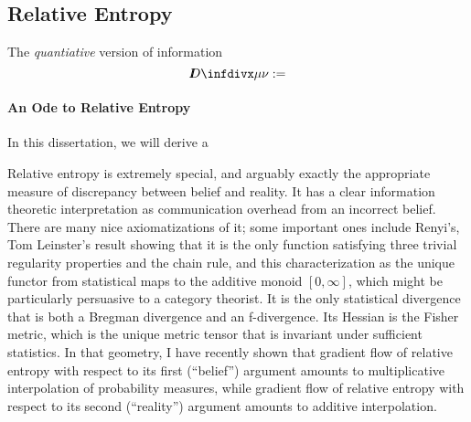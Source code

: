 
\subsection{Relative Entropy}
    \label{sec:relent-primer}

The \emph{quantiative} version of information 
\[
    \kldiv {\mu} {\nu} 
    := 
\]


\paragraph{An Ode to Relative Entropy}
In this dissertation, we will derive a 

Relative entropy is extremely special, and arguably exactly the
appropriate measure of discrepancy between belief and reality.  It has
a clear information theoretic interpretation as communication overhead
from an incorrect belief.  There are many nice axiomatizations of it;
some important ones include Renyi's, Tom Leinster's result showing
that it is the only function satisfying three trivial regularity
properties and the chain rule, and this characterization as the unique
functor from statistical maps to the additive monoid $[0,\infty]$, which
might be particularly persuasive to a category theorist.  It is the
only statistical divergence that is both a Bregman divergence and an
f-divergence.  Its Hessian is the Fisher metric, which is the unique
metric tensor that is invariant under sufficient statistics. In that
geometry, I have recently shown that gradient flow of relative entropy
with respect to its first (``belief'') argument amounts to
multiplicative interpolation of probability measures, while gradient
flow of relative entropy with respect to its second (``reality'')
argument amounts to additive interpolation. 



